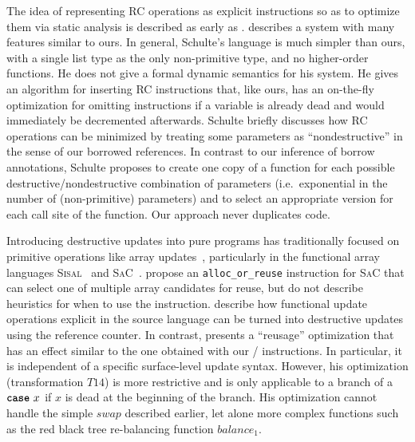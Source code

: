 The idea of representing RC operations as explicit instructions so as to
optimize them via static analysis is described as early as
\citet{Barth:1977:SGC:359636.359713}.
\citet{Schulte:1994} describes a system with many
features similar to ours. %
In general, Schulte's language is much simpler than ours, with a single list type
as the only non-primitive type, and no higher-order functions. He does
not give a formal dynamic semantics %
for his system. He gives an algorithm for inserting RC instructions that, like ours,
has an on-the-fly optimization for omitting  instructions if a
variable is already dead and would immediately be decremented
afterwards. Schulte briefly discusses how RC operations can be
minimized by treating some parameters as ``nondestructive'' in the
sense of our borrowed references. In contrast to our inference of
borrow annotations, Schulte proposes to create one copy of a function
for each possible destructive/nondestructive combination of parameters
(i.e.\ exponential in the number of (non-primitive) parameters) and
to select an appropriate version for each call site of the function. Our
approach never duplicates code.

Introducing destructive updates into pure programs has traditionally focused on
primitive operations like array updates~\cite{Hudak:1985:AUP:318593.318660}, particularly in the functional array
languages \textsc{Sisal}~\cite{sisal} and \textsc{SaC}~\cite{sac}. \citet{sac-reuse} propose an \verb!alloc_or_reuse!
instruction for \textsc{SaC} that can select one of multiple array candidates for reuse, but do not describe
heuristics for when to use the instruction.
\citet{Ferey:2016:CGU:2963372.2963387} describe how functional update operations
explicit in the source language can be turned into destructive updates using the
reference counter. In contrast, \citet{Schulte:1994} presents a ``reusage'' optimization that has an effect similar to the one
obtained with our / instructions. In particular, it is
independent of a specific surface-level update syntax.
However, his optimization (transformation $T14$) is more restrictive
and is only applicable to a branch of a $\texttt{\textbf{case}}\ x$ if $x$ is dead at the beginning of the branch.
His optimization cannot handle the simple $\textit{swap}$ described earlier,
let alone more complex functions such as the red black
tree re-balancing function $\textit{balance}_1$.

